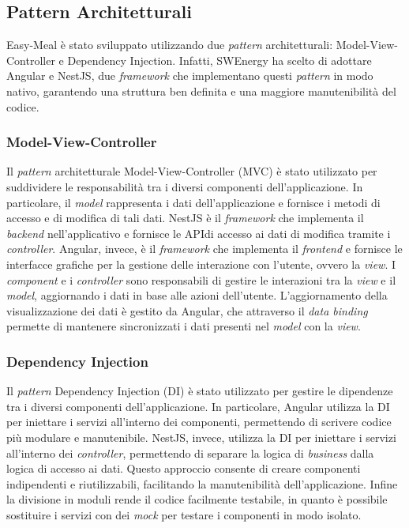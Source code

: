 \subsection{Pattern Architetturali}

Easy-Meal è stato sviluppato utilizzando due \textit{pattern} architetturali:
Model-View-Controller e Dependency Injection. Infatti, SWEnergy ha scelto di
adottare Angular e NestJS, due \textit{framework} che implementano questi \textit{pattern} in modo
nativo, garantendo una struttura ben definita e una maggiore manutenibilità del
codice.

\subsubsection{Model-View-Controller}

Il \textit{pattern} architetturale Model-View-Controller (MVC) è stato utilizzato per
suddividere le responsabilità tra i diversi componenti dell'applicazione. In
particolare, il \textit{model} rappresenta i dati dell'applicazione e fornisce i
metodi di accesso e di modifica di tali dati. NestJS è il \textit{framework} che
implementa il \textit{backend} nell'applicativo e fornisce le API\g di accesso ai dati
di modifica tramite i \textit{controller}. Angular, invece, è il \textit{framework} che
implementa il \textit{frontend} e fornisce le interfacce grafiche per la gestione delle
interazione con l'utente, ovvero la \textit{view}. I \textit{component} e i
\textit{controller} sono responsabili di gestire le interazioni tra la 
\textit{view} e il \textit{model},
aggiornando i dati in base alle azioni dell'utente. L'aggiornamento della
visualizzazione dei dati è gestito da Angular, che attraverso il \textit{data
binding} permette di mantenere sincronizzati i dati presenti nel \textit{model}
con la \textit{view}.

\subsubsection{Dependency Injection}

Il \textit{pattern} Dependency Injection (DI) è stato utilizzato per gestire le
dipendenze tra i diversi componenti dell'applicazione. In particolare, Angular
utilizza la DI per iniettare i servizi all'interno dei componenti, permettendo
di scrivere codice più modulare e manutenibile. NestJS, invece, utilizza la DI
per iniettare i servizi all'interno dei \textit{controller}, permettendo di separare la
logica di \textit{business} dalla logica di accesso ai dati. Questo approccio consente di
creare componenti indipendenti e riutilizzabili, facilitando la manutenibilità
dell'applicazione. Infine la divisione in moduli rende il codice facilmente
testabile, in quanto è possibile sostituire i servizi con dei \textit{mock} per
testare i componenti in modo isolato.


